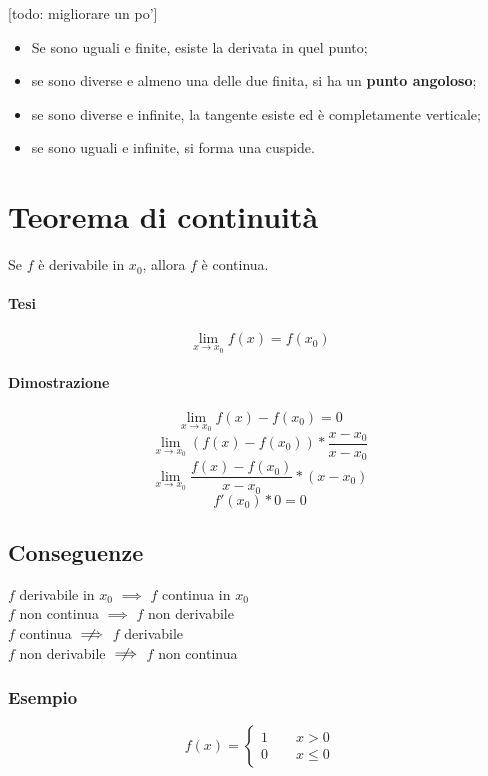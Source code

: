 \documentclass{article}
\begin{document}
[todo: migliorare un po']
\begin{itemize}
\item Se sono uguali e finite, esiste la derivata in quel punto;\\
\item se sono diverse e almeno una delle due finita, si ha un \textbf{punto angoloso};\\
\item se sono diverse e infinite, la tangente esiste ed è completamente verticale;\\
\item se sono uguali e infinite, si forma una cuspide.
\end{itemize}

\section{Teorema di continuità}
Se \(f\) è derivabile in \(x_0\), allora \(f\) è continua.

\paragraph{Tesi}
\[\lim_{x \to x_0} f(x) = f(x_0)\]

\paragraph{Dimostrazione}
\[\lim_{x \to x_0} f(x) - f(x_0) = 0\]
\[\lim_{x \to x_0} (f(x) - f(x_0)) * \frac{x - x_0}{x - x_0}\]
\[\lim_{x \to x_0} \frac{f(x) - f(x_0)}{x - x_0} * (x - x_0)\]
\[f'(x_0) * 0 = 0\]

\subsection{Conseguenze}
\(f\) derivabile in \(x_0\) \(\implies\) \(f\) continua in \(x_0\)\\
\(f\) non continua \(\implies\) \(f\) non derivabile\\
\(f\) continua \(\centernot\implies\) \(f\) derivabile\\
\(f\) non derivabile \(\centernot\implies\) \(f\) non continua\\

\subsubsection{Esempio}
\[f(x) = 
\begin{cases}
    1 \qquad x > 0\\
    0 \qquad x \leq 0
\end{cases}\]
\end{document}
